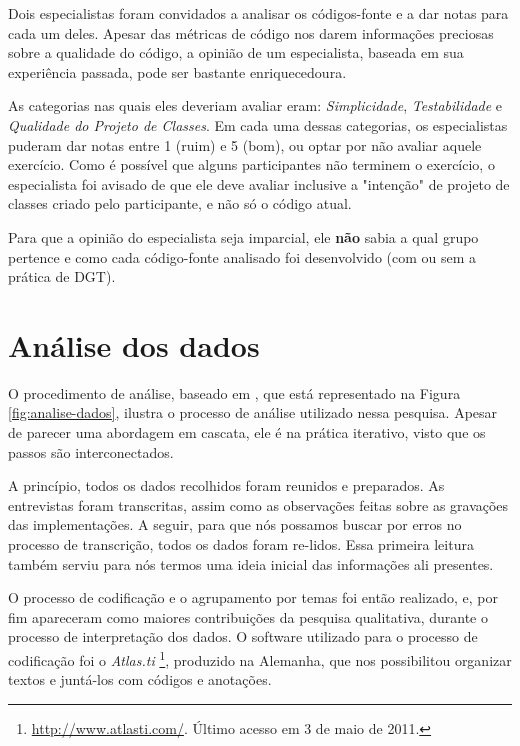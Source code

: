 Dois especialistas foram convidados a analisar os códigos-fonte e a dar notas para cada
um deles. Apesar das métricas de código nos darem informações
preciosas sobre a qualidade do código, a opinião de um especialista, baseada
em sua experiência passada, pode ser bastante enriquecedoura.

As categorias nas quais eles deveriam avaliar eram: \textit{Simplicidade}, \textit{Testabilidade} e
\textit{Qualidade do Projeto de Classes}.
Em cada uma dessas categorias, os especialistas puderam dar notas entre
1 (ruim) e 5 (bom), ou optar por não avaliar aquele exercício.
Como é possível que alguns participantes não terminem o exercício, o especialista
foi avisado de que ele deve avaliar inclusive a "intenção" de projeto de classes criado
pelo participante, e não só o código atual. 

Para que a opinião do especialista seja imparcial, ele \textbf{não} sabia a qual grupo
pertence e como cada código-fonte analisado foi desenvolvido (com ou sem a prática de DGT).

\section{Análise dos dados}
\label{sec:planejamento-analise}

O procedimento de análise, baseado em \cite{creswell}, que está representado na
Figura \ref{fig:analise-dados}, ilustra o processo de análise utilizado
nessa pesquisa. Apesar de parecer uma abordagem em cascata, ele é na prática 
iterativo, visto que os passos são interconectados. 

A princípio, todos os dados recolhidos foram reunidos e preparados. As entrevistas
foram transcritas, assim como as observações feitas sobre as gravações das implementações.
A seguir, para que nós possamos buscar por erros no processo de transcrição, todos
os dados foram re-lidos. Essa primeira leitura também serviu para nós termos
uma ideia inicial das informações ali presentes.

O processo de codificação e o agrupamento
por temas foi então realizado, e, por fim apareceram como maiores
contribuições da pesquisa qualitativa, durante o processo de interpretação dos
dados. O software utilizado para o processo de codificação foi
o \textit{Atlas.ti} \footnote{\url{http://www.atlasti.com/}. Último acesso em 3
de maio de 2011.}, produzido na Alemanha, que nos possibilitou 
organizar textos e juntá-los com códigos e anotações. 


